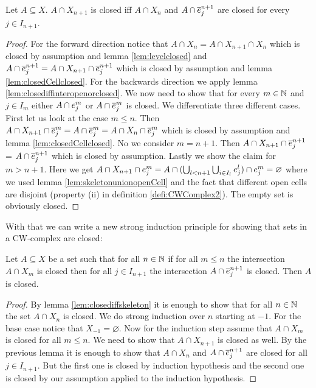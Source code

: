 \begin{lem}
    Let $A \subseteq X$. $A \cap X_{n + 1}$ is closed iff $A \cap X_n$ and $A \cap \closedCell{n + 1}{j}$ are closed for every $j \in I_{n + 1}$.
\end{lem}
\begin{proof}
    For the forward direction notice that $A \cap X_n = A \cap X_{n + 1} \cap X_n$ which is closed by assumption and lemma \ref{lem:levelclosed} and $A \cap \closedCell{n + 1}{j} = A \cap X_{n + 1} \cap \closedCell{n + 1}{j}$ which is closed by assumption and lemma \ref{lem:closedCellclosed}.
    For the backwards direction we apply lemma \ref{lem:closediffinteropenorclosed}. 
    We now need to show that for every $m \in \bN$ and $j \in I_m$ either $A \cap \openCell{m}{j}$ or $A \cap \closedCell{m}{j}$ is closed. 
    We differentiate three different cases. 
    First let us look at the case $m \le n$.
    Then $A \cap X_{n + 1} \cap \closedCell{m}{j} = A \cap \closedCell{m}{j} = A \cap X_n \cap \closedCell{m}{j}$ which is closed by assumption and lemma \ref{lem:closedCellclosed}. 
    No we consider $m = n + 1$. 
    Then $A \cap X_{n + 1} \cap \closedCell{n + 1}{j}$ = $A \cap \closedCell{n + 1}{j}$ which is closed by assumption. 
    Lastly we show the claim for $m > n + 1$. 
    Here we get $A \cap X_{n + 1} \cap \openCell{m}{j} = A \cap (\bigcup_{l < n + 1}\bigcup_{i \in I_l}\openCell{l}{j} ) \cap \openCell{m}{j} = \varnothing$ where we used lemma \ref{lem:skeletonunionopenCell} and the fact that different open cells are disjoint (property (ii) in definition \ref{defi:CWComplex2}). 
    The empty set is obviously closed.
\end{proof}

With that we can write a new strong induction principle for showing that sets in a CW-complex are closed: 

\begin{lem}\label{lem:inductionlevel}
    Let $A \subseteq X$ be a set such that for all $n \in \bN$ if for all $m \le n$ the intersection $A \cap X_m$ is closed then for all $j \in I_{n + 1}$ the intersection $A \cap \closedCell{n + 1}{j}$ is closed. 
    Then $A$ is closed.
\end{lem}
\begin{proof}
    By lemma \ref{lem:closediffskeleton} it is enough to show that for all $n \in \bN$ the set $A \cap X_n$ is closed. 
    We do strong induction over $n$ starting at $-1$. 
    For the base case notice that $X_{-1} = \varnothing$.
    Now for the induction step assume that $A \cap X_m$ is closed for all $m \le n$. 
    We need to show that $A \cap X_{n + 1}$ is closed as well. 
    By the previous lemma it is enough to show that $A \cap X_n$ and $A \cap \closedCell{n + 1}{j}$ are closed for all $j \in I_{n + 1}$. 
    But the first one is closed by induction hypothesis and the second one is closed by our assumption applied to the induction hypothesis.
\end{proof}

